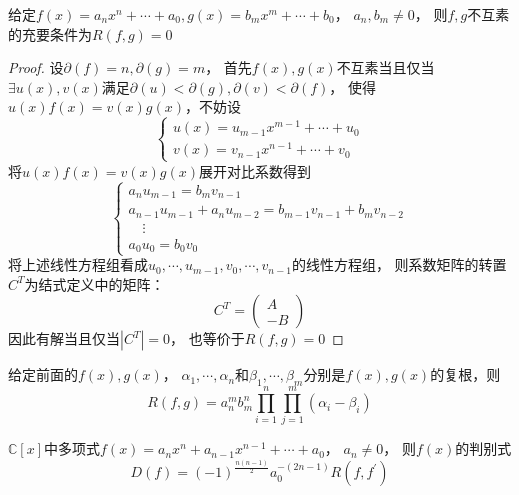 \begin{theorem}[结式判定定理]
  给定$f(x) = a_nx^n + \cdots + a_0, g(x) = b_mx^m + \cdots + b_0$，
  $a_n,b_m \neq 0$，
  则$f,g$不互素的充要条件为$R(f,g) = 0$
\end{theorem}

\begin{proof}
  设$\partial(f) = n, \partial(g) = m$，
  首先$f(x),g(x)$不互素当且仅当$\exists u(x),v(x)$满足$\partial(u) < \partial(g), \partial(v) < \partial(f)$，
  使得$u(x)f(x) = v(x)g(x)$，不妨设
  \begin{equation*}
    \begin{cases}
      u(x) = u_{m-1}x^{m-1} + \cdots + u_0\\
      v(x) = v_{n-1}x^{n-1} + \cdots + v_0
    \end{cases}
  \end{equation*}
  将$u(x)f(x) = v(x)g(x)$展开对比系数得到
  \begin{equation*}
    \begin{cases}
      a_n u_{m-1} = b_mv_{n-1}\\
      a_{n-1}u_{m-1} + a_nu_{m-2} = b_{m-1}v_{n-1} + b_m v_{n-2}\\
      \quad \vdots\\
      a_0u_0 = b_0v_0
    \end{cases}
  \end{equation*}
  将上述线性方程组看成$u_0,\cdots,u_{m-1},v_0,\cdots,v_{n-1}$的线性方程组，
  则系数矩阵的转置$C^T$为结式定义中的矩阵：
  \begin{equation*}
    C^T = \left(
      \begin{array}{c}
        A\\
        -B
      \end{array}
    \right)
  \end{equation*}
  因此有解当且仅当$|C^T| = 0$，
  也等价于$R(f,g) = 0$
\end{proof}

\begin{theorem}[结式计算公式]
  给定前面的$f(x),g(x)$，
  $\alpha_1,\cdots,\alpha_n$和$\beta_1,\cdots,\beta_m$分别是$f(x),g(x)$的复根，则
  \begin{equation*}
    R(f,g) = a_n^m b_m^n \prod \limits_{i = 1}^n \prod \limits_{j = 1}^m (\alpha_i - \beta_i)
  \end{equation*}
\end{theorem}

\begin{theorem}[判别式计算公式]
  $\mathbb{C}[x]$中多项式$f(x) = a_nx^n + a_{n-1}x^{n-1} + \cdots + a_0$，
  $a_n \neq 0$，
  则$f(x)$的判别式
  \begin{equation*}
    D(f) = (-1)^{\frac{n(n-1)}{2}} a_0^{-(2n - 1)}R(f,f^{\prime})
  \end{equation*}
\end{theorem}







